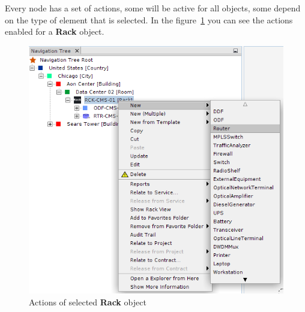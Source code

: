 \documentclass[a4paper]{article}
\begin{document}
	Every node has a set of actions, some will be active for all objects, some depend on the type of element that is selected. In the figure~\ref{fig:navigation_tree_context_menu} you can see the actions enabled for a \textbf{Rack} object. \\
	\begin{figure}[h!]
		\centering
		\includegraphics[width=0.7\linewidth]{img/navigation_tree_context_menu.png}
		\caption{Actions of selected \textbf{Rack} object}
		\label{fig:navigation_tree_context_menu}
	\end{figure}
\end{document}

